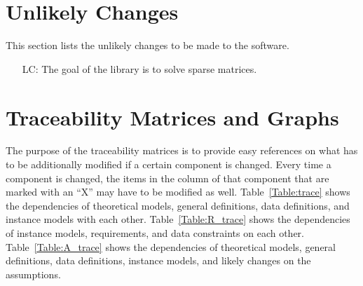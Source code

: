 \documentclass[12pt]{article}
\newcommand{\dref}[1]{GD\ref{#1}}
\newcommand{\ddref}[1]{DD\ref{#1}}
\newcommand{\dtref}[1]{DT\ref{#1}}
\newcommand{\tref}[1]{TM\ref{#1}}
\newcommand{\aref}[1]{A\ref{#1}}
\newcommand{\gsref}[1]{GS\ref{#1}}
\newcommand{\iref}[1]{IM\ref{#1}}
\newcommand{\rref}[1]{R\ref{#1}}
\newcommand{\nfrref}[1]{NFR\ref{#1}}
\newcounter{lcnum} %
\newcommand{\lcref}[1]{LC\ref{#1}}
\begin{document}
\section{Unlikely Changes}

This section lists the unlikely changes to be made to the software.

\begin{itemize}
\item[LC\refstepcounter{lcnum}\thelcnum\label{LC:sparse}:] The goal of the library is
  to solve sparse matrices.
\end{itemize}

\section{Traceability Matrices and Graphs}

The purpose of the traceability matrices is to provide easy references on what
has to be additionally modified if a certain component is changed.  Every time a
component is changed, the items in the column of that component that are marked
with an ``X'' may have to be modified as well.  Table~\ref{Table:trace} shows the
dependencies of theoretical models, general definitions, data definitions, and
instance models with each other. Table~\ref{Table:R_trace} shows the
dependencies of instance models, requirements, and data constraints on each
other. Table~\ref{Table:A_trace} shows the dependencies of theoretical models,
general definitions, data definitions, instance models, and likely changes on
the assumptions.




\end{document}
